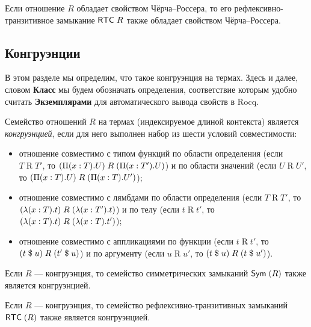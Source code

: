 \begin{theorem}
Если отношение $R$ обладает свойством Чёрча--Россера,
то его рефлексивно-транзитивное замыкание $\mathrel{\mathsf{RTC}} R$
также обладает свойством Чёрча--Россера.
\end{theorem}

\subsection{Конгруэнции}

В этом разделе мы определим, что такое конгруэнция на
термах. Здесь и далее, словом \textbf{Класс} мы будем
обозначать определения, соответствие которым удобно
считать \textbf{Экземплярами} для автоматического
вывода свойств в Rocq.

\begin{class}[Конгруэнция]
Семейство отношений $R$ на термах (индексируемое длиной
контекста) является \emph{конгруэнцией}, если для него
выполнен набор из шести условий совместимости:
\begin{itemize}
\item отношение совместимо с типом функций по области
    определения (если $T \mathrel{R} T'$, то
    $(\Pi(x:T).U) \mathrel{R} (\Pi(x:T').U)$) и по
    области значений (если $U \mathrel{R} U'$, то
    $(\Pi(x:T).U) \mathrel{R} (\Pi(x:T).U')$);
\item отношение совместимо с лямбдами по области
    определения (если $T \mathrel{R} T'$, то \\
    $(\lambda(x:T).t) \mathrel{R} (\lambda(x:T').t)$) и по
    телу (если $t \mathrel{R} t'$, то
    $(\lambda(x:T).t) \mathrel{R} (\lambda(x:T).t')$);
\item отношение совместимо с аппликациями по функции
    (если $t \mathrel{R} t'$, то
    $(t\;\$\;u) \mathrel{R} (t'\;\$\;u)$) и по
    аргументу (если $u \mathrel{R} u'$, то
    $(t\;\$\;u) \mathrel{R} (t\;\$\;u')$).
\end{itemize}
\end{class}

\begin{instance}
Если $R$ --- конгруэнция, то семейство симметрических
замыканий $\mathrel{\mathsf{Sym}}(R)$ также является конгруэнцией.
\end{instance}

\begin{instance}
Если $R$ --- конгруэнция, то семейство
рефлексивно-транзитивных замыканий $\mathrel{\mathsf{RTC}}(R)$ также
является конгруэнцией.
\end{instance}

